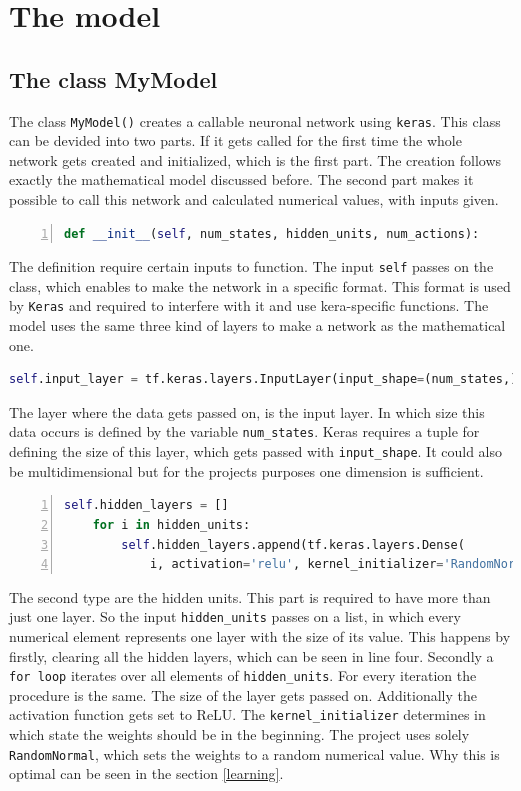 \documentclass[12pt]{article}
\begin{document}
\section{The model}\label{sec:TheModel}
\subsection{The class MyModel}\label{mymodel}
The class \lstinline{MyModel()} creates a callable neuronal network using \lstinline{keras}. This class can be devided into two parts. If it gets called for the first time the whole network gets created and initialized, which is the first part. The creation follows exactly the mathematical model discussed before. The second part makes it possible to call this network and calculated numerical values, with inputs given.
\lstset{ numbers=left, stepnumber=1,      firstnumber=1,  numberfirstline=true}
\begin{lstlisting}[language=Python,numbers=left, caption=Example - Creation of a neuronal network using Keras.]
def __init__(self, num_states, hidden_units, num_actions):
\end{lstlisting}
The definition require certain inputs to function. The input \lstinline{self} passes on the class, which enables to make the network in a specific format. This format is used by \lstinline{Keras} and required to interfere with it and use kera-specific functions. The model uses the same three kind of layers to make a network as the mathematical one.
\lstset{ numbers=left, stepnumber=1,      firstnumber=2,  numberfirstline=true}
\begin{lstlisting}[language=Python]
    self.input_layer = tf.keras.layers.InputLayer(input_shape=(num_states,))
\end{lstlisting}
The layer where the data gets passed on, is the input layer. In which size this data occurs is defined by the variable \lstinline{num_states}. Keras requires a tuple for defining the size of this layer, which gets passed with \lstinline{input_shape}. It could also be multidimensional but for the projects purposes one dimension is sufficient.
\lstset{ numbers=left, stepnumber=1,      firstnumber=4,  numberfirstline=true}
\begin{lstlisting}[language=Python,numbers=left]
    self.hidden_layers = []
    for i in hidden_units: 
        self.hidden_layers.append(tf.keras.layers.Dense( 
            i, activation='relu', kernel_initializer='RandomNormal')) 
\end{lstlisting}
The second type are the hidden units. This part is required to have more than just one layer. So the input \lstinline{hidden_units} passes on a list, in which every numerical element represents one layer with the size of its value. This happens by firstly, clearing all the hidden layers, which can be seen in line four. Secondly a \lstinline{for loop} iterates over all elements of \lstinline{hidden_units}. For every iteration the procedure is the same. The size of the layer gets passed on. Additionally the activation function gets set to ReLU. The \lstinline{kernel_initializer} determines in which state the weights should be in the beginning. The project uses solely \lstinline{RandomNormal}, which sets the weights to a random numerical value. Why this is optimal can be seen in the section \ref{learning}.
\end{document}
